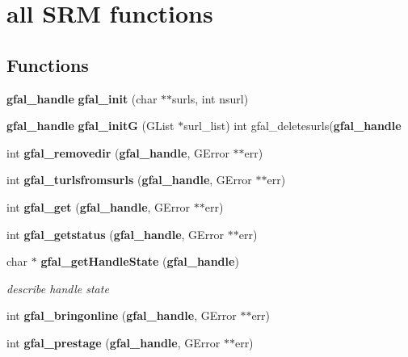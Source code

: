 \section{all SRM functions}
\label{group__srm__group}
\subsection*{Functions}
\begin{DoxyCompactItemize}
\item 
{\bf gfal\_\-handle} {\bfseries gfal\_\-init} (char $\ast$$\ast$surls, int nsurl)\label{group__srm__group_ga1fdda04fad1e9531f7ace3bdc976bbc1}

\item 
{\bf gfal\_\-handle} {\bfseries gfal\_\-initG} (GList $\ast$surl\_\-list) int gfal\_\-deletesurls({\bf gfal\_\-handle}\label{group__srm__group_ga92e0ea95c87f25b5e4696e02f3f11393}

\item 
int {\bfseries gfal\_\-removedir} ({\bf gfal\_\-handle}, GError $\ast$$\ast$err)\label{group__srm__group_ga3a00aca183c77764672861a8bf35e670}

\item 
int {\bfseries gfal\_\-turlsfromsurls} ({\bf gfal\_\-handle}, GError $\ast$$\ast$err)\label{group__srm__group_ga899efa11d0ff1df69a8286b5ed36bc13}

\item 
int {\bfseries gfal\_\-get} ({\bf gfal\_\-handle}, GError $\ast$$\ast$err)\label{group__srm__group_ga04da42f7513751162e740f4b16defbce}

\item 
int {\bfseries gfal\_\-getstatus} ({\bf gfal\_\-handle}, GError $\ast$$\ast$err)\label{group__srm__group_gae9a31c94b163faf91de0b62180fc9f9e}

\item 
char $\ast$ {\bf gfal\_\-getHandleState} ({\bf gfal\_\-handle})
\begin{DoxyCompactList}\small\item\em describe handle state \item\end{DoxyCompactList}\item 
int {\bfseries gfal\_\-bringonline} ({\bf gfal\_\-handle}, GError $\ast$$\ast$err)\label{group__srm__group_gaac1c0c2597f22732c4ad1e601147503b}

\item 
int {\bfseries gfal\_\-prestage} ({\bf gfal\_\-handle}, GError $\ast$$\ast$err)\label{group__srm__group_gadc0485ba3a0f5cf6912cede961665d1c}


\end{DoxyCompactItemize}
